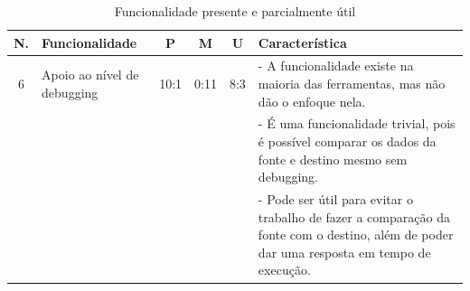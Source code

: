 \begin{table}[h!]
	\centering
	\caption{Funcionalidade presente e parcialmente útil}
	\label{grupo1}
	\begin{tabular}{|c|p{4cm}|c|c|c|p{7cm}|}
		\hline
		N. & Funcionalidade & P & M & U & Característica  \\
		\hline
		6 & Apoio ao nível de debugging & 10:1 & 0:11 & 8:3 & - A funcionalidade existe na maioria das ferramentas, mas não dão o enfoque nela. \\
		&&&&& - É uma funcionalidade trivial, pois é possível comparar os dados da fonte e destino mesmo sem debugging.\\
		&&&&& - Pode ser útil para evitar o trabalho de fazer a comparação da fonte com o destino, além de poder dar uma resposta em tempo de execução.\\
		\hline
		
		
	\end{tabular}
\end{table}


